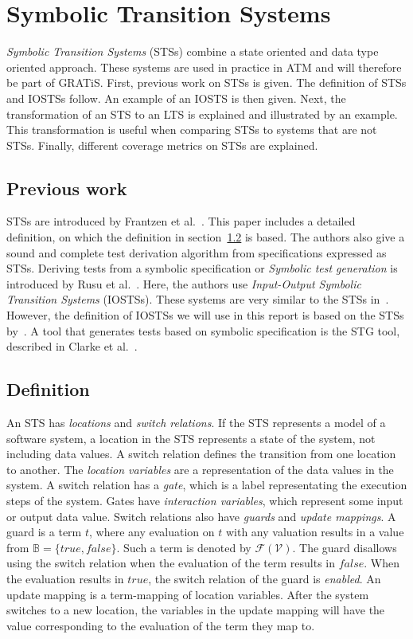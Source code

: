 \section{Symbolic Transition Systems}\label{sec:symbolic}
\textit{Symbolic Transition Systems} (STSs) combine a state oriented and data type oriented approach. These systems are used in practice in ATM and will therefore be part of GRATiS. First, previous work on STSs is given. The definition of STSs and IOSTSs follow. An example of an IOSTS is then given. Next, the transformation of an STS to an LTS is explained and illustrated by an example. This transformation is useful when comparing STSs to systems that are not STSs. Finally, different coverage metrics on STSs are explained.

\subsection{Previous work}
STSs are introduced by Frantzen et al.~\cite{Frantzen:Symbolic}. This paper includes a detailed definition, on which the definition in section~\ref{sec:sts_definition} is based. The authors also give a sound and complete test derivation algorithm from specifications expressed as STSs. Deriving tests from a symbolic specification or \textit{Symbolic test generation} is introduced by Rusu et al.~\cite{rusu:symbolic}. Here, the authors use \textit{Input-Output Symbolic Transition Systems} (IOSTSs). These systems are very similar to the STSs in~\cite{Frantzen:Symbolic}. However, the definition of IOSTSs we will use in this report is based on the STSs by~\cite{Frantzen:Symbolic}. A tool that generates tests based on symbolic specification is the STG tool, described in Clarke et al.~\cite{clarke:STG}.

\subsection{Definition}\label{sec:sts_definition}
An STS has \textit{locations} and \textit{switch relations}. If the STS represents a model of a software system, a location in the STS represents a state of the system, not including data values. A switch relation defines the transition from one location to another. The \textit{location variables} are a representation of the data values in the system. A switch relation has a \textit{gate}, which is a label representating the execution steps of the system. Gates have \textit{interaction variables}, which represent some input or output data value. Switch relations also have \textit{guards} and \textit{update mappings}. A guard is a term $t$, where any evaluation on $t$ with any valuation results in a value from $\mathbb{B} = \{\mathit{true, false}\}$. Such a term is denoted by $\mathcal{F}(\mathcal{V})$. The guard disallows using the switch relation when the evaluation of the term results in $\mathit{false}$. When the evaluation results in $\mathit{true}$, the switch relation of the guard is \textit{enabled}. An update mapping is a term-mapping of location variables. After the system switches to a new location, the variables in the update mapping will have the value corresponding to the evaluation of the term they map to.

